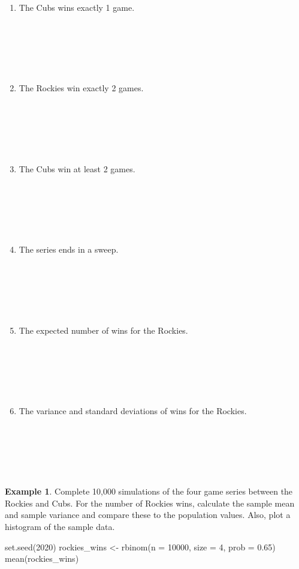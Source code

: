 \documentclass[
  11pt,
]{book}
\newenvironment{Shaded}{\begin{snugshade}}{\end{snugshade}}
\newcommand{\AttributeTok}[1]{\textcolor[rgb]{0.77,0.63,0.00}{#1}}
\newcommand{\DecValTok}[1]{\textcolor[rgb]{0.00,0.00,0.81}{#1}}
\newcommand{\FloatTok}[1]{\textcolor[rgb]{0.00,0.00,0.81}{#1}}
\newcommand{\FunctionTok}[1]{\textcolor[rgb]{0.00,0.00,0.00}{#1}}
\newcommand{\NormalTok}[1]{#1}
\newcommand{\OtherTok}[1]{\textcolor[rgb]{0.56,0.35,0.01}{#1}}
\theoremstyle{definition}
\theoremstyle{definition}
\newtheorem{example}{Example}[chapter]
\theoremstyle{definition}
\theoremstyle{definition}
\theoremstyle{remark}
\begin{document}
\begin{enumerate}
\def\labelenumi{(\alph{enumi})}
\item
  The Cubs wins exactly 1 game.\\
  \strut \\
  \strut \\
  \strut \\
\item
  The Rockies win exactly 2 games.\\
  \strut \\
  \strut \\
  \strut \\
\item
  The Cubs win at least 2 games.\\
  \strut \\
  \strut \\
  \strut \\
\item
  The series ends in a sweep.\\
  \strut \\
  \strut \\
  \strut \\
\item
  The expected number of wins for the Rockies.\\
  \strut \\
  \strut \\
  \strut \\
\item
  The variance and standard deviations of wins for the Rockies.\\
  \strut \\
  \strut \\
  \strut \\
\end{enumerate}

\begin{example}
Complete 10,000 simulations of the four game series between the Rockies and Cubs. For the number of Rockies wins, calculate the sample mean and sample variance and compare these to the population values. Also, plot a histogram of the sample data.
\end{example}

\begin{Shaded}
\begin{Highlighting}[]
\FunctionTok{set.seed}\NormalTok{(}\DecValTok{2020}\NormalTok{)}
\NormalTok{rockies\_wins }\OtherTok{\textless{}{-}} \FunctionTok{rbinom}\NormalTok{(}\AttributeTok{n =} \DecValTok{10000}\NormalTok{, }\AttributeTok{size =} \DecValTok{4}\NormalTok{, }\AttributeTok{prob =} \FloatTok{0.65}\NormalTok{)}
\FunctionTok{mean}\NormalTok{(rockies\_wins)}
\end{Highlighting}
\end{Shaded}
\end{document}
